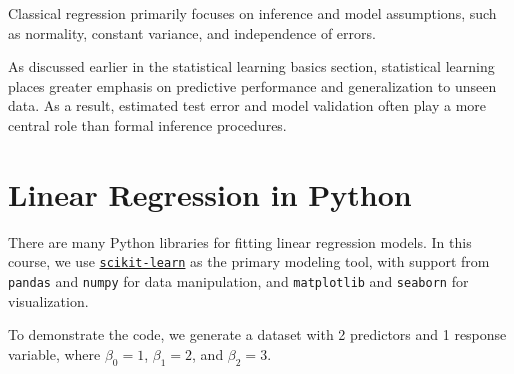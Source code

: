\documentclass[
  letterpaper,
  DIV=11,
  numbers=noendperiod]{scrreprt}
\theoremstyle{definition}
\theoremstyle{definition}
\theoremstyle{plain}
\theoremstyle{plain}
\theoremstyle{remark}
\begin{document}
\begin{tcolorbox}[enhanced jigsaw, arc=.35mm, bottomrule=.15mm, bottomtitle=1mm, breakable, colback=white, colbacktitle=quarto-callout-note-color!10!white, colframe=quarto-callout-note-color-frame, coltitle=black, left=2mm, leftrule=.75mm, opacityback=0, opacitybacktitle=0.6, rightrule=.15mm, title=\textcolor{quarto-callout-note-color}{\faInfo}\hspace{0.5em}{Note}, titlerule=0mm, toprule=.15mm, toptitle=1mm]

Classical regression primarily focuses on inference and model
assumptions, such as normality, constant variance, and independence of
errors.

As discussed earlier in the statistical learning basics section,
statistical learning places greater emphasis on predictive performance
and generalization to unseen data. As a result, estimated test error and
model validation often play a more central role than formal inference
procedures.

\end{tcolorbox}

\section{Linear Regression in Python}\label{linear-regression-in-python}

There are many Python libraries for fitting linear regression models. In
this course, we use
\href{https://scikit-learn.org/}{\texttt{scikit-learn}} as the primary
modeling tool, with support from \texttt{pandas} and \texttt{numpy} for
data manipulation, and \texttt{matplotlib} and \texttt{seaborn} for
visualization.

To demonstrate the code, we generate a dataset with 2 predictors and 1
response variable, where \(\beta_0 = 1\), \(\beta_1 = 2\), and
\(\beta_2 = 3\).
\end{document}
